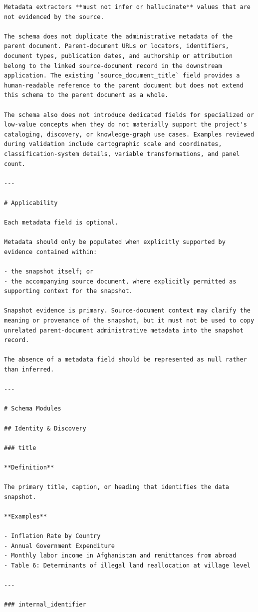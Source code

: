 \documentclass{article}
\begin{document}
\begin{lstlisting}
Metadata extractors **must not infer or hallucinate** values that are not evidenced by the source.

The schema does not duplicate the administrative metadata of the parent document. Parent-document URLs or locators, identifiers, document types, publication dates, and authorship or attribution belong to the linked source-document record in the downstream application. The existing `source_document_title` field provides a human-readable reference to the parent document but does not extend this schema to the parent document as a whole.

The schema also does not introduce dedicated fields for specialized or low-value concepts when they do not materially support the project's cataloging, discovery, or knowledge-graph use cases. Examples reviewed during validation include cartographic scale and coordinates, classification-system details, variable transformations, and panel count.

---

# Applicability

Each metadata field is optional.

Metadata should only be populated when explicitly supported by evidence contained within:

- the snapshot itself; or
- the accompanying source document, where explicitly permitted as supporting context for the snapshot.

Snapshot evidence is primary. Source-document context may clarify the meaning or provenance of the snapshot, but it must not be used to copy unrelated parent-document administrative metadata into the snapshot record.

The absence of a metadata field should be represented as null rather than inferred.

---

# Schema Modules

## Identity & Discovery

### title

**Definition**

The primary title, caption, or heading that identifies the data snapshot.

**Examples**

- Inflation Rate by Country
- Annual Government Expenditure
- Monthly labor income in Afghanistan and remittances from abroad
- Table 6: Determinants of illegal land reallocation at village level

---

### internal_identifier


\end{lstlisting}
\end{document}
